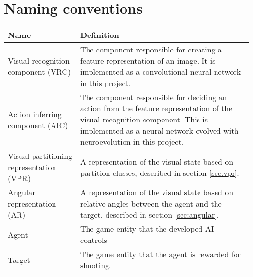 
\section{Naming conventions}

\begin{table}[H]
\begin{center}

\begin{tabularx}{\textwidth}{ | l | X |}
		\hline
	
		\textbf{Name} & \textbf{Definition} \\ \hline
		Visual recognition component (VRC) & The component responsible for creating a feature representation of an image. It is implemented as a convolutional neural network in this project. \\ \hline
		Action inferring component (AIC) & The component responsible for deciding an action from the feature representation of the visual recognition component. This is implemented as a neural network evolved with neuroevolution in this project. \\ \hline
		Visual partitioning representation (VPR) & A representation of the visual state based on partition classes, described in section \ref{sec:vpr}. \\ \hline
		
		Angular representation (AR) & A representation of the visual state based on relative angles between the agent and the target, described in section \ref{sec:angular}. \\ \hline
		Agent & The game entity that the developed AI controls. \\ \hline
		Target & The game entity that the agent is rewarded for shooting. \\ \hline
		
\end{tabularx}
\end{center}
\label{tab:naming-conventions} 
\end{table}

\newpage